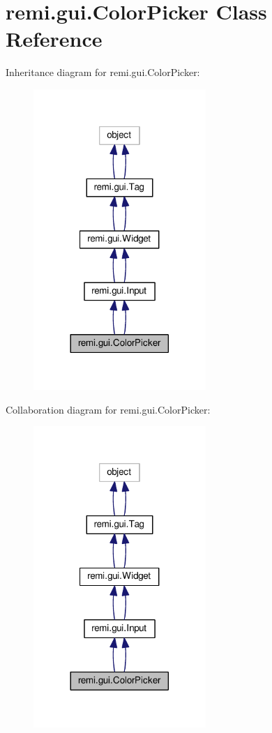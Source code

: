 \hypertarget{classremi_1_1gui_1_1ColorPicker}{}\section{remi.\+gui.\+Color\+Picker Class Reference}
\label{classremi_1_1gui_1_1ColorPicker}


Inheritance diagram for remi.\+gui.\+Color\+Picker\+:
\nopagebreak
\begin{figure}[H]
\begin{center}
\leavevmode
\includegraphics[width=185pt]{d1/d7d/classremi_1_1gui_1_1ColorPicker__inherit__graph}
\end{center}
\end{figure}


Collaboration diagram for remi.\+gui.\+Color\+Picker\+:
\nopagebreak
\begin{figure}[H]
\begin{center}
\leavevmode
\includegraphics[width=185pt]{d6/df9/classremi_1_1gui_1_1ColorPicker__coll__graph}
\end{center}
\end{figure}

